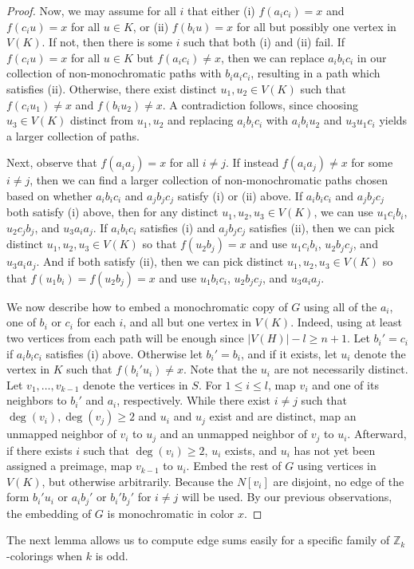 \documentclass[11pt]{article}
\newcommand{\bZ}{\mathbb{Z}}
\newcommand\abs[1]{\left\lvert #1 \right\rvert}
\theoremstyle{definition}
\theoremstyle{plain}
\begin{document}
\begin{proof}
    Now, we may assume for all $i$ that either (i) $f(a_ic_i)=x$ and $f(c_iu)=x$ for all $u\in K$, or (ii) $f(b_iu)=x$ for all but possibly one vertex in $V(K)$. If not, then there is some $i$ such that both (i) and (ii) fail. If $f(c_iu)=x$ for all $u\in K$ but $f(a_ic_i)\neq x$, then we can replace $a_ib_ic_i$ in our collection of non-monochromatic paths with $b_ia_ic_i$, resulting in a path which satisfies (ii).  Otherwise, there exist distinct $u_1,u_2\in V(K)$ such that $f(c_iu_1)\neq x$ and $f(b_iu_2)\neq x$. A contradiction follows, since choosing $u_3\in V(K)$ distinct from $u_1,u_2$ and replacing $a_ib_ic_i$ with $a_ib_iu_2$ and $u_3u_1c_i$ yields a larger collection of paths. 

    Next, observe that $f(a_ia_j)=x$ for all $i\neq j$. If instead $f(a_ia_j)\neq x$ for some $i\neq j$, then we can find a larger collection of non-monochromatic paths chosen based on whether $a_ib_ic_i$ and $a_jb_jc_j$ satisfy (i) or (ii) above. If $a_ib_ic_i$ and $a_jb_jc_j$ both satisfy (i) above, then for any distinct $u_1,u_2,u_3\in V(K)$, we can use $u_1c_ib_i$, $u_2c_jb_j$, and  $u_3a_ia_j$. If $a_ib_ic_i$ satisfies (i) and $a_jb_jc_j$ satisfies (ii), then we can pick distinct $u_1,u_2,u_3\in V(K)$ so that $f(u_2b_j)=x$ and use $u_1c_ib_i$, $u_2b_jc_j$, and $u_3a_ia_j$. And if both satisfy (ii), then we can pick distinct $u_1,u_2,u_3\in V(K)$ so that $f(u_1b_i)=f(u_2b_j)=x$ and use $u_1b_ic_i$, $u_2b_jc_j$, and $u_3a_ia_j$.
    
    We now describe how to embed a monochromatic copy of $G$ using all of the $a_i$, one of $b_i$ or $c_i$ for each $i$, and all but one vertex in $V(K)$. Indeed, using at least two vertices from each path will be enough since $\abs{V(H)}-l\geq n+1$. Let $b_i'=c_i$ if $a_ib_ic_i$ satisfies (i) above. Otherwise let $b_i'=b_i$, and if it exists, let $u_i$ denote the vertex in $K$ such that $f(b_i'u_i)\neq x$. Note that the $u_i$ are not necessarily distinct. Let $v_1,\ldots,v_{k-1}$ denote the vertices in $S$. For $1\leq i\leq l$, map $v_i$ and one of its neighbors to $b_i'$ and $a_i$, respectively. While there exist $i\neq j$ such that $\deg(v_i),\deg(v_j)\geq 2$ and $u_i$ and $u_j$ exist and are distinct, map an unmapped neighbor of $v_i$ to $u_j$ and an unmapped neighbor of $v_j$ to $u_i$. Afterward, if there exists $i$ such that $\deg(v_i)\geq 2$, $u_i$ exists, and $u_i$ has not yet been assigned a preimage, map $v_{k-1}$ to $u_i$. Embed the rest of $G$ using vertices in $V(K)$, but otherwise arbitrarily. Because the $N[v_i]$ are disjoint, no edge of the form $b_i'u_i$ or $a_ib_j'$ or $b_i'b_j'$ for $i\neq j$ will be used. By our previous observations, the embedding of $G$ is monochromatic in color $x$.
\end{proof}
The next lemma allows us to compute edge sums easily for a specific family of $\bZ_k$-colorings when $k$ is odd.
\end{document}
